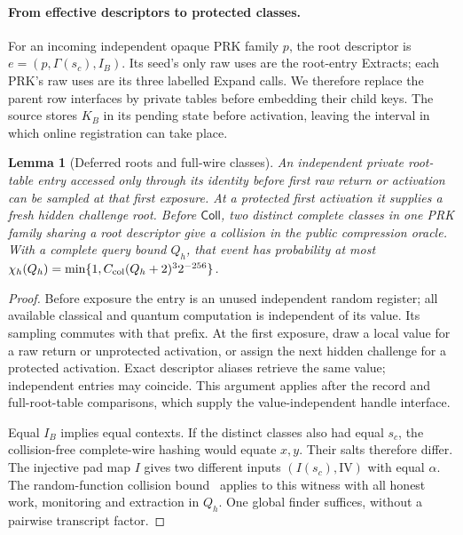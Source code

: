 \documentclass[pdflatex]{sn-jnl}
\theoremstyle{thmstyleone}
\newtheorem{lemma}[theorem]{Lemma}
\theoremstyle{thmstylethree}
\theoremstyle{thmstyletwo}
\begin{document}
\paragraph{From effective descriptors to protected classes.}
For an incoming independent opaque PRK family $p$, the root descriptor
is $e=(p,\Gamma(s_c),I_B)$. Its seed's only raw uses are the root-entry
Extracts; each PRK's raw uses are its
three labelled Expand calls. We therefore replace the parent row
interfaces by private tables before embedding their child keys. The
source stores $K_B$ in its pending state before activation, leaving
the interval in which online registration can take place.

\begin{lemma}[Deferred roots and full-wire classes]
\label{lem:bootstrap-deferred}
An independent private root-table entry accessed only through its
identity before first raw return or activation can be sampled at that
first exposure. At a protected first activation it supplies a fresh
hidden challenge root. Before $\mathsf{Coll}$, two distinct complete
classes in one PRK family sharing a root descriptor give a collision
in the public compression oracle. With a complete query bound $Q_h$,
that event has probability at most
$\chi_h(Q_h)=\min\{1,C_{\rm col}(Q_h+2)^3 2^{-256}\}$.
\end{lemma}
\begin{proof}
Before exposure the entry is an unused independent random register;
all available classical and quantum computation is independent of its
value. Its sampling commutes with that prefix. At the first exposure,
draw a local value for a raw return or unprotected activation, or assign
the next hidden challenge for a protected activation. Exact descriptor
aliases retrieve the same value; independent entries may coincide.
This argument applies after the record and full-root-table comparisons,
which supply the value-independent handle interface.

Equal $I_B$ implies equal contexts. If the distinct classes also had
equal $s_c$, the collision-free complete-wire hashing would equate
$x,y$. Their salts therefore differ. The injective pad map $I$ gives
two different inputs $(I(s_c),\mathrm{IV})$ with equal $\alpha$.
The random-function collision bound~\cite[Theorem~7]{zhandryCollision2015}
applies to this witness with all honest work, monitoring and extraction
in $Q_h$. One global finder suffices, without a pairwise transcript factor.
\end{proof}
\end{document}
